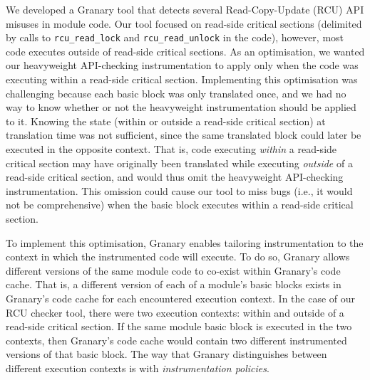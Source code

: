 \documentclass[preprint]{sigplanconf}
\begin{document}
We developed a Granary tool that detects several Read-Copy-Update (RCU) API misuses in module code. Our tool focused on read-side critical sections (delimited by calls to \texttt{rcu\_read\_lock} and \texttt{rcu\_read\_unlock} in the code), however, most code executes outside of read-side critical sections. As an optimisation, we wanted our heavyweight API-checking instrumentation to apply only when the code was executing within a read-side critical section. Implementing this optimisation was challenging because each basic block was only translated once, and we had no way to know whether or not the heavyweight instrumentation should be applied to it. Knowing the state (within or outside a read-side critical section) at translation time was not sufficient, since the same translated block could later be executed in the opposite context. That is, code executing \emph{within} a read-side critical section may have originally been translated while executing \emph{outside} of a read-side critical section, and would thus omit the heavyweight API-checking instrumentation. This omission could cause our tool to miss bugs (i.e., it would not be comprehensive) when the basic block executes within a read-side critical section.


To implement this optimisation, Granary enables tailoring instrumentation to the context in which the instrumented code will execute. To do so, Granary allows different versions of the same module code to co-exist within Granary's code cache. That is, a different version of each of a module's basic blocks exists in Granary's code cache  for each encountered execution context. In the case of our RCU checker tool, there were two execution contexts: within and outside of a read-side critical section. If the same module basic block is  executed in the two contexts, then Granary's code cache would contain two different instrumented versions of that basic block. The way that Granary distinguishes between different execution contexts is with \emph{instrumentation policies}. 
\end{document}
